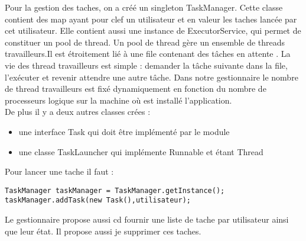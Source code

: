 Pour la gestion des taches, on a créé un singleton TaskManager. Cette classe contient des map ayant pour clef un utilisateur et en valeur les taches lancée par cet utilisateur. Elle contient aussi une instance de ExecutorService, qui permet de constituer un pool de thread. Un pool de thread gère un ensemble de threads travailleurs.Il est étroitement lié à une file contenant des tâches en attente . La vie des thread travailleurs est simple : demander la tâche suivante dans la file, l'exécuter et revenir attendre une autre tâche. Dans notre gestionnaire le nombre de thread travailleurs est fixé dynamiquement en fonction du nombre de processeurs logique sur la machine où est installé l'application.\\
De plus il y a deux autres classes crées : \\
\begin{itemize}
\item une interface Task qui doit être implémenté par le module
\item une classe TaskLauncher qui implémente Runnable et étant Thread
\end{itemize}
Pour lancer une tache il faut :
\begin{verbatim}
TaskManager taskManager = TaskManager.getInstance();
taskManager.addTask(new Task(),utilisateur);
\end{verbatim}
Le gestionnaire propose aussi cd fournir une liste de tache par utilisateur ainsi que leur état. Il propose aussi je supprimer ces taches.\\


